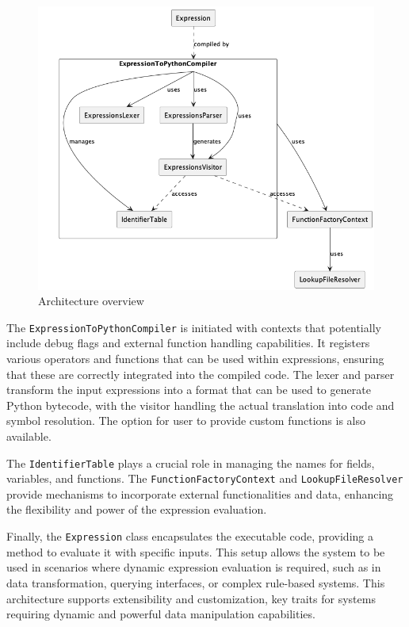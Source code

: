 \begin{figure}[htbp]
    \centering
    \includegraphics[width=1.0\columnwidth]{diagrams/architecture.png}
    \caption{Architecture overview}
    \label{fig:architecture}
\end{figure}

The \texttt{ExpressionToPythonCompiler} is initiated with contexts that potentially include debug flags and external function handling capabilities. It registers various operators and functions that can be used within expressions, ensuring that these are correctly integrated into the compiled code. The lexer and parser transform the input expressions into a format that can be used to generate Python bytecode, with the visitor handling the actual translation into code and symbol resolution. The option for user to provide custom functions is also available.

The \texttt{IdentifierTable} plays a crucial role in managing the names for fields, variables, and functions. The \texttt{FunctionFactoryContext} and \texttt{LookupFileResolver} provide mechanisms to incorporate external functionalities and data, enhancing the flexibility and power of the expression evaluation.

Finally, the \texttt{Expression} class encapsulates the executable code, providing a method to evaluate it with specific inputs. This setup allows the system to be used in scenarios where dynamic expression evaluation is required, such as in data transformation, querying interfaces, or complex rule-based systems. This architecture supports extensibility and customization, key traits for systems requiring dynamic and powerful data manipulation capabilities.

